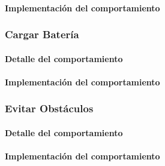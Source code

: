 \paragraph{Implementaci\'on del comportamiento}

\subsubsection{Cargar Bater\'ia}
\label{recharge_battery}
\paragraph{Detalle del comportamiento}
\paragraph{Implementaci\'on del comportamiento}

\subsubsection{Evitar Obst\'aculos}
\label{avoid_obstacles}
\paragraph{Detalle del comportamiento}
\paragraph{Implementaci\'on del comportamiento}

